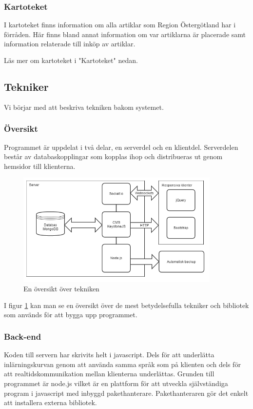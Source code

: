 \subsubsection{Kartoteket}
I kartoteket finns information om alla artiklar som Region Östergötland har i förråden.
Här finns bland annat information om var artiklarna är placerade samt information relaterade till inköp av artiklar.

Läs mer om kartoteket i "Kartoteket" nedan.

\subsection{Tekniker}
Vi börjar med att beskriva tekniken bakom systemet.

\subsubsection{Översikt}
Programmet är uppdelat i två delar, en serverdel och en klientdel.
Serverdelen består av databaskopplingar som kopplas ihop och distribueras ut genom hemsidor till klienterna.

\begin{figure}
  \centering
  \includegraphics[width=0.9\textwidth]{images/techoverview.png}
  \caption{En översikt över tekniken}
  \label{fig:techoverview}
\end{figure}

I figur \ref{fig:techoverview} kan man se en översikt över de mest betydelsefulla tekniker och bibliotek som används för att bygga upp programmet.

\subsubsection{Back-end}
Koden till servern har skrivits helt i javascript.
Dels för att underlätta inlärningskurvan genom att använda samma språk som på klienten och dels för att realtidskommunikation mellan klienterna underlättas.
Grunden till programmet är node.js vilket är en plattform för att utveckla självständiga program i javascript med inbyggd pakethanterare.
Pakethanteraren gör det enkelt att installera externa bibliotek.

